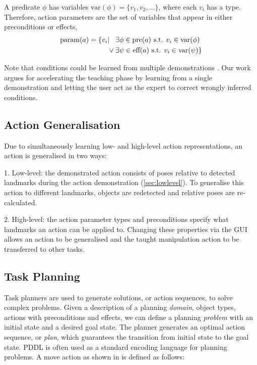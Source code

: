 A predicate $\phi$ has variables $\text{var}(\phi) = \{v_1, v_2, \dots\}$, where each $v_i$ has a type.
Therefore, action parameters are the set of variables that appear in either preconditions or effects, \ie
\begin{align*}
     \text{param}(a) = \{v_i &| \hspace{0.3cm}\exists \phi \in \text{pre}(a) \text{ s.t. } v_i \in \text{var}(\phi)\\
     &\lor \exists \psi \in \text{eff}(a) \text{ s.t. } v_i \in \text{var}(\psi) \}
\end{align*}

Note that conditions could be learned from multiple demonstrations \cite{abdo2013learning,konidaris2018fromSkills}.
Our work argues for accelerating the teaching phase by learning from a single demonstration and letting the user act as the expert to correct wrongly inferred conditions.

 
\subsection{Action Generalisation}
\label{sec:generalisation}
Due to simultaneously learning low- and high-level action representations, an action is generalised in two ways:

1. Low-level: the demonstrated action consists of poses relative to detected landmarks during the action demonstration (\ref{sec:lowlevel}). 
To generalise this action to different landmarks, objects are redetected and relative poses are re-calculated.

2. High-level: the action parameter types and preconditions specify what landmarks an action can be applied to. 
Changing these properties via the GUI allows an action to be generalised and the taught manipulation action to be transferred to other tasks.


\subsection{Task Planning}
\label{sec:planning}
Task planners are used to generate solutions, or action sequences, to solve complex problems.
Given a description of a planning \textit{domain}, \ie object types, actions with preconditions and effects, we can define a planning \textit{problem} with an initial state and a desired goal state. 
The planner generates an optimal action sequence, or \textit{plan}, which guarantees the transition from initial state to the goal state. 
PDDL \cite{mcdermott1998pddl} %
is often used as a standard encoding language for planning problems.
A move action as shown in  is defined as follows:

